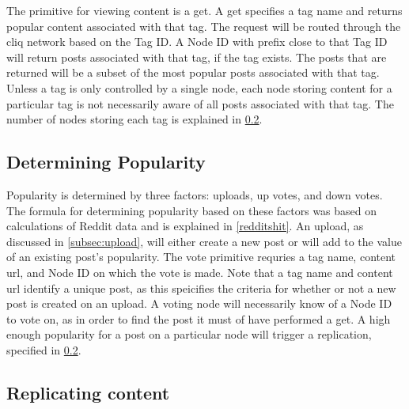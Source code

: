 \documentclass{sig-alternate}
\begin{document}
The primitive for viewing content is a get. 
A get specifies a tag name and returns popular content associated with that tag. 
The request will be routed through the cliq network based on the Tag ID. 
A Node ID with prefix close to that Tag ID will return posts associated with that tag, if the tag exists. 
The posts that are returned will be a subset of the most popular posts associated with that tag. 
Unless a tag is only controlled by a single node, each node storing content for a particular tag is not necessarily aware of all posts associated with that tag. 
The number of nodes storing each tag is explained in \ref{subsec:replication}. 

\subsection{Determining Popularity}
\label{subsec:popularity}

Popularity is determined by three factors: uploads, up votes, and down votes. 
The formula for determining popularity based on these factors was based on calculations of Reddit data and is explained in \ref{redditshit}.
An upload, as discussed in \ref{subsec:upload}, will either create a new post or will add to the value of an existing post's popularity. 
The vote primitive requries a tag name, content url, and Node ID on which the vote is made. 
Note that a tag name and content url identify a unique post, as this speicifies the criteria for whether or not a new post is created on an upload. 
A voting node will necessarily know of a Node ID to vote on, as in order to find the post it must of have performed a get. 
A high enough popularity for a post on a particular node will trigger a replication, specified in \ref{subsec:replication}. 

\subsection{Replicating content}
\label{subsec:replication}
\end{document}
